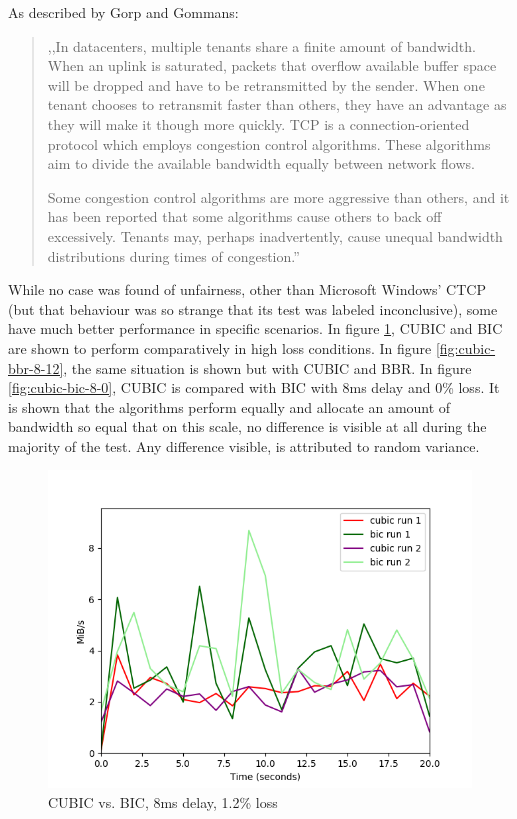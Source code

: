 \documentclass{article}
\begin{document}
As described by Gorp and Gommans\cite{gg}:

\begin{quote}
	,,In datacenters, multiple tenants share a finite amount of bandwidth. When an uplink
	is saturated, packets that overflow available buffer space will be dropped and have to
	be retransmitted by the sender. When one tenant chooses to retransmit faster than
	others, they have an advantage as they will make it though more quickly. TCP is
	a connection-oriented protocol which employs congestion control algorithms. These
	algorithms aim to divide the available bandwidth equally between network flows.

	Some congestion control algorithms are more aggressive than others, and it has been
	reported that some algorithms cause others to back off excessively. Tenants may,
	perhaps inadvertently, cause unequal bandwidth distributions during times of congestion.''
\end{quote}

While no case was found of unfairness, other than Microsoft Windows' CTCP (but
that behaviour was so strange that its test was labeled inconclusive), some
have much better performance in specific scenarios. In figure
\ref{fig:cubic-bic-8-12}, CUBIC and BIC are shown to perform comparatively in
high loss conditions. In figure \ref{fig:cubic-bbr-8-12}, the same situation is
shown but with CUBIC and BBR. In figure \ref{fig:cubic-bic-8-0}, CUBIC is
compared with BIC with 8ms delay and 0\% loss. It is shown that the algorithms
perform equally and allocate an amount of bandwidth so equal that on this
scale, no difference is visible at all during the majority of the test. Any
difference visible, is attributed to random variance.

\begin{figure}[H]
	\includegraphics{cubic_vs_bic_8_12.png}
	\caption{CUBIC vs. BIC, 8ms delay, 1.2\% loss}
	\label{fig:cubic-bic-8-12}
\end{figure}
\end{document}
